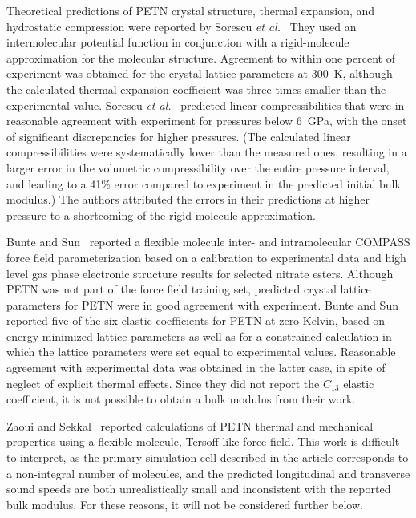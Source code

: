 \documentclass[prb,aps,nobibnotes,twocolumn,doublespace,twocolumngrid,superbib]{revtex4}
\begin{document}
Theoretical predictions of PETN crystal structure, thermal expansion,
and hydrostatic compression were reported by Sorescu {\it et
al.}~\cite{Sorescu_1999v103A, Sorescu_1999v103} They used an
intermolecular potential function in conjunction with a rigid-molecule 
approximation for the molecular structure. Agreement to within one percent 
of experiment was obtained for the crystal lattice parameters at 300~K, although
the calculated thermal expansion coefficient was three times smaller than the
experimental value.  Sorescu {\it et al.}~\cite{Sorescu_1999v103}
predicted linear compressibilities that were in reasonable agreement
with experiment for pressures below 6~GPa, with the onset of
significant discrepancies for higher pressures.  (The calculated
linear compressibilities were systematically lower than the measured
ones, resulting in a larger error in the volumetric compressibility
over the entire pressure interval, and leading to a 41\% error
compared to experiment in the predicted initial bulk modulus.) The
authors attributed the errors in their predictions at higher pressure
to a shortcoming of the rigid-molecule approximation.

Bunte and Sun~\cite{Bunte_2000v104} reported a flexible molecule
inter- and intramolecular COMPASS force field parameterization based
on a calibration to experimental data and high level gas phase
electronic structure results for selected nitrate esters.  Although
PETN was not part of the force field training set, predicted crystal
lattice parameters for PETN were in good agreement with experiment.
Bunte and Sun reported five of the six elastic coefficients for PETN
at zero Kelvin, based on energy-minimized lattice parameters as well
as for a constrained calculation in which the lattice parameters were
set equal to experimental values.  Reasonable agreement with
experimental data was obtained in the latter case, in spite of neglect
of explicit thermal effects.  Since they did not report the $C_{13}$
elastic coefficient, it is not possible to obtain a bulk modulus from
their work.

Zaoui and Sekkal~\cite{Zaoui_2001v118} reported calculations of PETN
thermal and mechanical properties using a flexible molecule, Tersoff-like force
field.  This work is difficult to interpret, as the primary simulation
cell described in the article corresponds to a non-integral number of
molecules, and the predicted longitudinal and transverse sound speeds
are both unrealistically small and inconsistent with the reported bulk
modulus.  For these reasons, it will not be considered further below.
\end{document}
